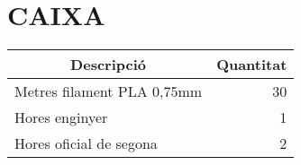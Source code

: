 \chapter{\uppercase{Caixa}}

\begin{table}[H]
  \begin{center}
    \begin{tabularx} {\textwidth} {|X|r|} \hline
  \multicolumn{1}{|c|}{Descripció} &  \multicolumn{1}{c|}{Quantitat}\\ \hline \hline
    Metres filament PLA 0,75mm & 30 \\ \hline
            Hores enginyer & 1 \\ \hline
    Hores oficial de segona & 2 \\ \hline
    \end{tabularx}%
  \end{center}

  \label{tab:addlabel}%
\end{table}%